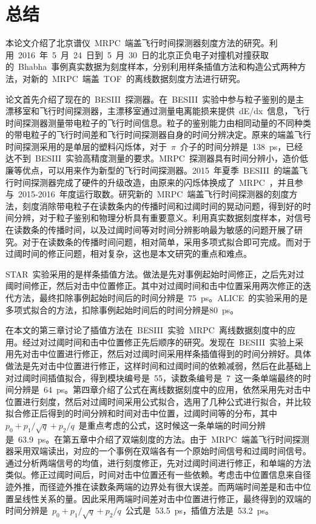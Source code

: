\chapter{总结}
本论文介绍了北京谱仪~MRPC~端盖飞行时间探测器刻度方法的研究。利用~2016~年~5~月~24~日到~5~月~30~日的北京正负电子对撞机对撞获取的~Bhabha~事例真实数据为刻度样本，分别利用样条插值方法和构造公式两种方法，对新的~MRPC~端盖~TOF~的离线数据刻度方法进行研究。

论文首先介绍了现在的~BESIII~探测器。在~BESIII~实验中参与粒子鉴别的是主漂移室和飞行时间探测器，主漂移室通过测量电离能损来提供~dE/dx~信息，飞行时间探测器测量带电粒子的飞行时间信息。粒子的鉴别能力由相同动量的不同种类的带电粒子的飞行时间差和飞行时间探测器自身的时间分辨决定。原来的端盖飞行时间探测采用的是单层的塑料闪烁体，对于~$\pi$~介子的时间分辨是~138~ps，已经达不到~BESIII~实验高精度测量的要求。MRPC~探测器具有时间分辨小，造价低廉等优点，可以用来作为新型的飞行时间探测器。2015~年夏季~BESIII~的端盖飞行时间探测器完成了硬件的升级改造，由原来的闪烁体换成了~MRPC~，并且参与~2015-2016~年度运行取数。研究新的~MRPC~端盖飞行时间探测器的刻度方法，刻度消除带电粒子在读数条内的传播时间和过阈时间的晃动问题，得到好的时间分辨，对于粒子鉴别和物理分析具有重要意义。利用真实数据刻度样本，对信号在读数条的传播时间，以及过阈时间等对时间分辨影响最为敏感的问题开展了研究。对于在读数条的传播时间问题，相对简单，采用多项式拟合即可完成。而对于过阈时间的修正问题，相对复杂，这也是本文研究的重点和难点。

STAR~实验采用的是样条插值方法。做法是先对事例起始时间修正，之后先对过阈时间修正，然后对击中位置修正。其中对过阈时间和击中位置采用两次修正的迭代方法，最终扣除事例起始时间后的时间分辨是~75~ps。ALICE~的实验采用的是多项式拟合的方法，扣除事例起始时间后的时间分辨是80~ps。

在本文的第三章讨论了插值方法在~BESIII~实验~MRPC~离线数据刻度中的应用。经过对过阈时间和击中位置修正先后顺序的研究。发现在~BESIII~实验上采用先对击中位置进行修正，然后对过阈时间采用样条插值得到的时间分辨好。具体做法是先对击中位置进行修正，这样时间和过阈时间的依赖减弱，然后在此基础上对过阈时间插值拟合，得到模块编号是~55，读数条编号是~7~这一条单端最终的时间分辨是~64~ps。第四章介绍了公式在离线数据刻度中的应用，依然采用先对击中位置进行刻度，然后对过阈时间采用公式拟合，选用了几种公式进行拟合，并比较拟合修正后得到的时间分辨和时间对击中位置，过阈时间等的分布，其中~${p_{0}+p_{1}/\sqrt{q}+p_{2}/q}$~是重点考虑的公式，这时候这一条单端的时间分辨是~63.9~ps。在第五章中介绍了双端刻度的方法。由于~MRPC~端盖飞行时间探测器采用双端读出，对应的一个事例在双端各有一个原始时间信号和过阈时间信号。通过分析两端信号的均值，进行刻度修正，先对过阈时间进行修正，和单端的方法类似。修正过阈时间后，时间对击中位置还有一些依赖。考虑击中位置信息来自径迹外推，而径迹外推在读数条两端的边界处有很大误差。而两端时间差是和击中位置呈线性关系的量。因此采用两端时间差对击中位置进行修正，最终得到的双端的时间分辨是~${p_{0}+p_{1}/\sqrt{q}+p_{2}/q}$~公式是~53.5~ps，插值方法是~53.2~ps。

